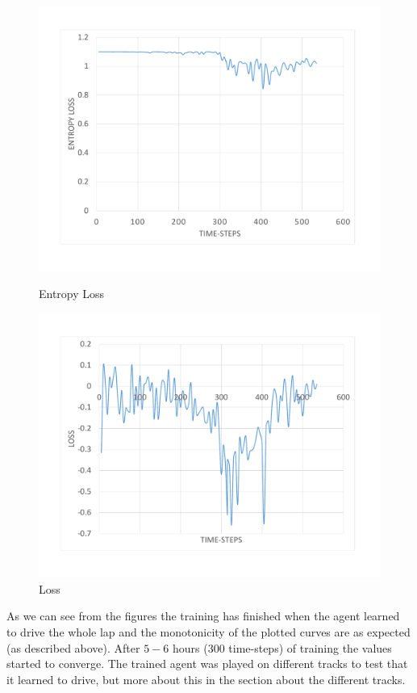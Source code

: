 \begin{figure}[H]
	\includegraphics[width=\linewidth]{Figures/EntropyLoss}
	\caption{Entropy Loss}\label{fig:EntropyLoss}
	\endminipage\hfill
	\includegraphics[width=\linewidth]{Figures/Loss}
	\caption{Loss}\label{fig:Loss}
	\endminipage
\end{figure}
As we can see from the figures the training has finished when the agent learned to drive the whole lap and the monotonicity of the plotted curves are as expected (as described above). After $5-6$ hours ($300$ time-steps) of training the values started to converge. The trained agent was played on different tracks to test that it learned to drive, but more about this in the section about the different tracks.

